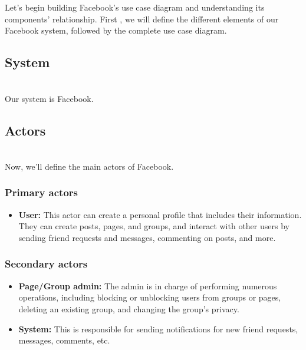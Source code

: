 

Let's begin building Facebook's use case diagram and understanding its components' relationship. First , we will define the different elements of our Facebook system, followed by the complete use case diagram.

\subsection{System}\label{Oa_C_X_Xopu6H6vwg5jFU}
\\
Our system is Facebook.

\subsection{Actors}\label{cMhqlcmVTyx0y510r-UVt}
\\
Now, we'll define the main actors of Facebook.

\subsubsection{Primary actors}\label{EC2WaQXB654ygbo5Yle8i}

\begin{itemize}
\item
\protect{}\label{HWfbdXLULS5_WG7yJjw8C}
\textbf{User:} This actor can create a personal profile that includes their information. They can create posts, pages, and groups, and interact with other users by sending friend requests and messages, commenting on posts, and more.
\end{itemize}

\subsubsection{Secondary actors}\label{dUzhQ_rbY0yQvMnccxZ3v}

\begin{itemize}
\item
\protect{}\label{-pJVIPgtSKNq5s6320kp7}
\textbf{Page/Group admin:} The admin is in charge of performing numerous operations, including blocking or unblocking users from groups or pages, deleting an existing group, and changing the group's privacy.
\item
\protect{}\label{_JSoiFqjoPXA9TrBwWybe}
\textbf{System:} This is responsible for sending notifications for new friend requests, messages, comments, etc.
\end{itemize}

